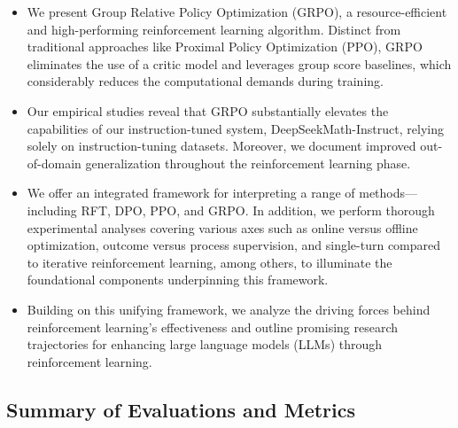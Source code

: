 \begin{itemize}[topsep=0pt]
    \item We present Group Relative Policy Optimization (GRPO), a resource-efficient and high-performing reinforcement learning algorithm. Distinct from traditional approaches like Proximal Policy Optimization (PPO), GRPO eliminates the use of a critic model and leverages group score baselines, which considerably reduces the computational demands during training.
    \item Our empirical studies reveal that GRPO substantially elevates the capabilities of our instruction-tuned system, DeepSeekMath-Instruct, relying solely on instruction-tuning datasets. Moreover, we document improved out-of-domain generalization throughout the reinforcement learning phase.
    \item We offer an integrated framework for interpreting a range of methods—including RFT, DPO, PPO, and GRPO. In addition, we perform thorough experimental analyses covering various axes such as online versus offline optimization, outcome versus process supervision, and single-turn compared to iterative reinforcement learning, among others, to illuminate the foundational components underpinning this framework.
    \item Building on this unifying framework, we analyze the driving forces behind reinforcement learning’s effectiveness and outline promising research trajectories for enhancing large language models (LLMs) through reinforcement learning.
\end{itemize}

\subsection{Summary of Evaluations and Metrics}

